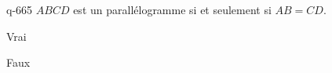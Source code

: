 \begin{truefalse}{q-665}
$ABCD$ est un parallélogramme si et seulement si $AB=CD$.
\item Vrai
\item* Faux
\end{truefalse}

